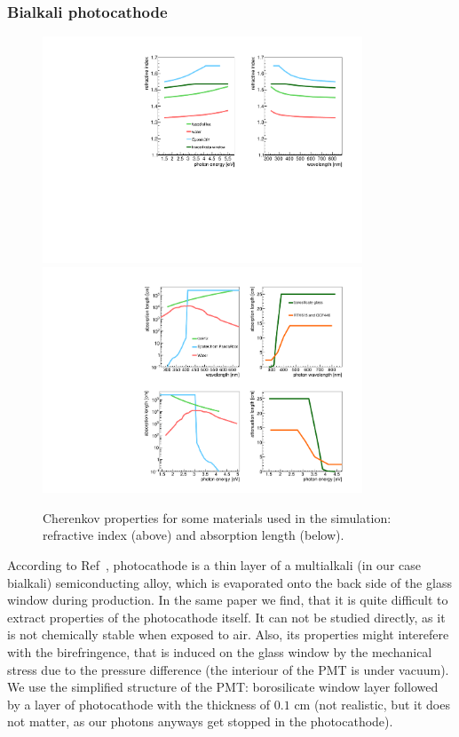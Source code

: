 \documentclass[11pt, a4paper]{article}
\begin{document}
\subsubsection*{Bialkali photocathode}

\begin{figure}[!h]
\centering
\includegraphics[angle=0,width=0.85\textwidth]{pics/refind.pdf} \\
\includegraphics[angle=0,width=0.85\textwidth]{pics/ablen.pdf}
\caption{\label{pic:mat}
Cherenkov properties for some materials used in the simulation: refractive index (above) and absorption length (below).
}
\end{figure}

According to Ref~\cite{pcpaper}, photocathode is a thin layer of a multialkali (in our case bialkali) semiconducting alloy, which is evaporated onto the back side of the glass window during production. In the same paper we find, that it is quite difficult to extract properties of the photocathode itself. It can not be studied directly, as it is not chemically stable when exposed to air. Also, its properties might interefere with the birefringence, that is induced on the glass window by the mechanical stress due to the pressure difference (the interiour of the PMT is under vacuum). We use the simplified structure of the PMT: borosilicate window layer followed by a layer of photocathode with the thickness of $0.1$ cm (not realistic, but it does not matter, as our photons anyways get stopped in the photocathode). 
\end{document}
